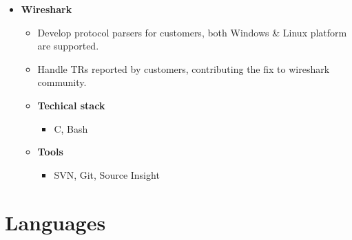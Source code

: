 \documentclass[11pt,a4paper,sans]{moderncv}        %
\begin{document}
{\begin{itemize}
\begin{itemize}
        \begin{itemize}
        \item Java, Perl, Bash
        \end{itemize}
    \item \textbf{Tools}
        \begin{itemize}
        \item Git, Vim, Eclipse
        \end{itemize}
    \end{itemize}
\item \textbf{Wireshark}
    \begin{itemize}
    \item Develop protocol parsers for customers, both Windows \& Linux platform are supported.
    \item Handle TRs reported by customers, contributing the fix to wireshark community.
    \item \textbf{Techical stack}
        \begin{itemize}
        \item C, Bash
        \end{itemize}
    \item \textbf{Tools}
        \begin{itemize}
        \item SVN, Git, Source Insight
        \end{itemize}
    \end{itemize}
\end{itemize}}

\section{Languages}

\clearpage
\end{document}
